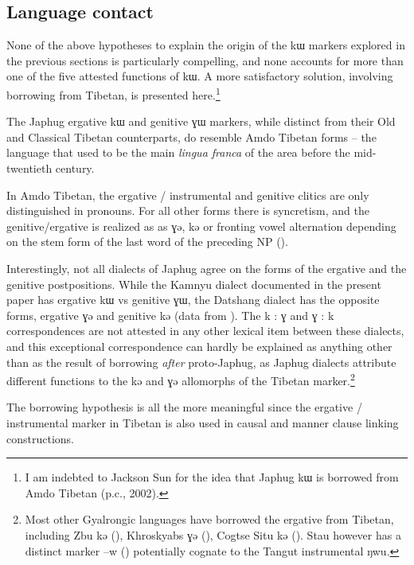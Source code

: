 \documentclass[oldfontcommands,oneside,a4paper,11pt]{article}
\newcommand{\ipa}[1]{{\phon #1}} %
\begin{document}
\subsection{Language contact} \label{sec:contact}
None of the above hypotheses to explain the origin of the \ipa{kɯ} markers explored in the previous sections is particularly compelling, and none  accounts for more than one of the five attested functions of \ipa{kɯ}. A more satisfactory solution, involving borrowing from Tibetan, is presented here.\footnote{I am indebted to Jackson Sun for the idea that Japhug \ipa{kɯ} is borrowed from Amdo Tibetan (p.c., 2002). }

The Japhug ergative \ipa{kɯ} and genitive \ipa{ɣɯ} markers, while distinct from their Old and Classical Tibetan counterparts, do resemble Amdo Tibetan forms -- the language that used to be the main \textit{lingua franca} of the area before the mid-twentieth century.

In Amdo Tibetan, the ergative / instrumental and genitive clitics are only distinguished in pronouns. For all other forms there is syncretism, and the genitive/ergative is realized as as \ipa{ɣə}, \ipa{kə} or fronting vowel alternation depending on the stem form of the last word of the preceding NP (\citealt[62]{haller04themchen}). 

Interestingly, not all dialects of Japhug agree on the forms of the ergative and the genitive postpositions. While the Kamnyu dialect documented in the present paper has ergative \ipa{kɯ} vs genitive \ipa{ɣɯ}, the Datshang dialect has the opposite forms, ergative \ipa{ɣə} and genitive \ipa{kə} (data from \citealt[63-4]{lin11direction}). The \ipa{k} : \ipa{ɣ } and \ipa{ɣ} : \ipa{k} correspondences are not attested in any other lexical item between these dialects, and this exceptional correspondence can hardly be explained as anything other than as the result of borrowing \textit{after} proto-Japhug,  as Japhug dialects attribute  different functions to the \ipa{kə} and \ipa{ɣə} allomorphs of the Tibetan marker.\footnote{Most other Gyalrongic languages have borrowed the ergative from Tibetan, including Zbu \ipa{kə} (\citealt{gongxun14agreement}), Khroskyabs \ipa{ɣə} (\citealt[36]{lai13affixale}), Cogtse Situ \ipa{kə}  (\citealt[336]{linxr93jiarong}). Stau however has a distinct marker \ipa{--w} (\citealt{jacques14rtau}) potentially cognate to the Tangut instrumental \ipa{ŋwu}.}
 
The borrowing hypothesis is all the more meaningful since the ergative / instrumental marker in Tibetan is also used in causal and manner clause linking constructions. 
\end{document}
